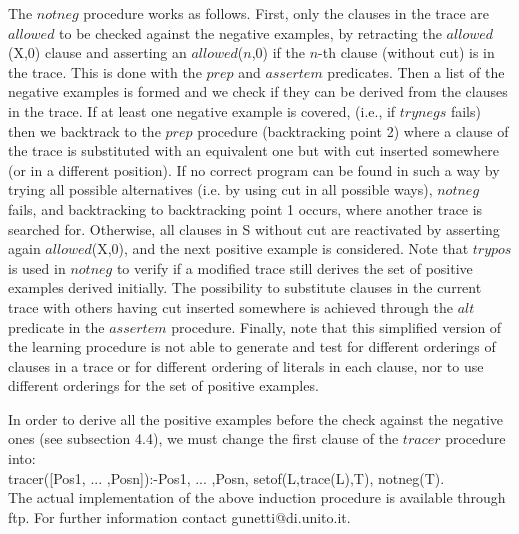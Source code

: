 The $notneg$ procedure works as follows. First, only 
the clauses in the trace are $allowed$ to be 
checked against the negative examples, by 
retracting the $allowed$(X,0) clause and asserting an $allowed$($n$,0)
if the $n$-th clause (without cut) is in the trace.
This is done with the $prep$ and 
$assertem$ predicates. Then a list of the negative examples is formed
and we check if they can be derived from the clauses in the
trace. If at least one
negative example is covered, (i.e., if $trynegs$ fails) then we backtrack to
the $prep$ procedure (backtracking point 2)
where a clause of the trace is substituted
with an equivalent one but with cut inserted somewhere (or in a different
position). If no correct program can be found in such a way by trying all
possible alternatives (i.e. by using cut in all possible ways),
$notneg$ fails, and backtracking to backtracking point 1 occurs, where another
trace is searched for.
Otherwise, all clauses in S without cut are reactivated by asserting again 
$allowed$(X,0), and the next positive example is considered.
Note that $trypos$ is used in $notneg$ to verify if a modified trace still
derives the set of positive examples derived initially. The possibility
to substitute clauses in the current trace with others having cut inserted
somewhere is achieved through the $alt$ predicate in the $assertem$ procedure.
Finally, note that this simplified version of the learning procedure is not able
to generate and test for different orderings of clauses in a trace or for
different ordering of literals in each clause, nor to use
different orderings for the set of positive examples.
 
In order to derive all the positive examples before the check
against the negative ones (see subsection 4.4), 
we must
change the first clause of the $tracer$ procedure into:\\
 
\noindent
tracer([Pos1, ... ,Posn]):-Pos1, ... ,Posn,
                           setof(L,trace(L),T),
                           notneg(T).\\
 
                                 
\noindent
The actual implementation of the above induction procedure
is available through ftp. For further information contact
gunetti@di.unito.it.
 
